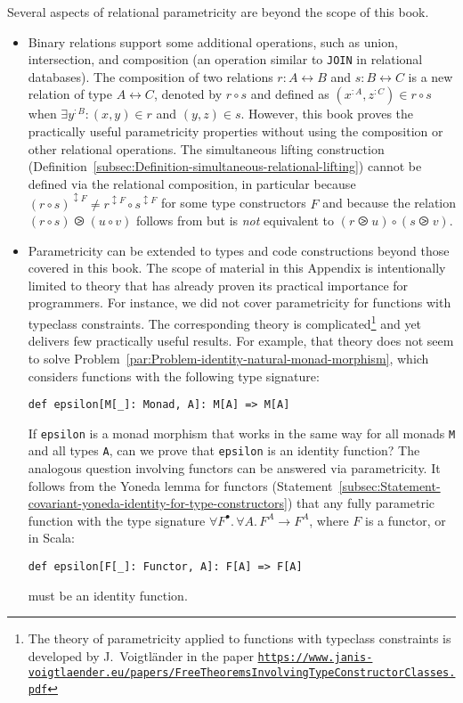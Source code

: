 Several aspects of relational parametricity are beyond the scope of
this book.
\begin{itemize}
\item Binary relations support some additional operations, such as union,
intersection, and composition (an operation similar to \lstinline!JOIN!
in relational databases). The composition of two relations $r:A\leftrightarrow B$
and $s:B\leftrightarrow C$ is a new relation of type $A\leftrightarrow C$,
denoted by $r\circ s$ and defined as $(x^{:A},z^{:C})\in r\circ s$
when $\exists y^{:B}:(x,y)\in r$ and $(y,z)\in s$. However, this
book proves the practically useful parametricity properties without
using the composition or other relational operations. The simultaneous
lifting construction (Definition~\ref{subsec:Definition-simultaneous-relational-lifting})
cannot be defined via the relational composition, in particular because
$(r\circ s)^{\updownarrow F}\neq r^{\updownarrow F}\circ s^{\updownarrow F}$
for some type constructors $F$ and because the relation $(r\circ s)\ogreaterthan(u\circ v)$
follows from but is \emph{not} equivalent to $(r\ogreaterthan u)\circ(s\ogreaterthan v)$. 
\item Parametricity can be extended to types and code constructions beyond
those covered in this book. The scope of material in this Appendix
is intentionally limited to theory that has already proven its practical
importance for programmers. For instance, we did not cover parametricity
for functions with typeclass constraints. The corresponding theory
is complicated\footnote{The theory of parametricity applied to functions with typeclass constraints
is developed by J.~Voigtl\"ander
in the paper \texttt{\href{https://www.janis-voigtlaender.eu/papers/FreeTheoremsInvolvingTypeConstructorClasses.pdf}{https://www.janis-voigtlaender.eu/papers/FreeTheoremsInvolvingTypeConstructorClasses.pdf}}} and yet delivers few practically useful results. For example, that
theory does not seem to solve Problem~\ref{par:Problem-identity-natural-monad-morphism},
which considers functions with the following type signature:
\begin{lstlisting}
def epsilon[M[_]: Monad, A]: M[A] => M[A]
\end{lstlisting}
If \lstinline!epsilon! is a monad morphism that works in the same
way for all monads \lstinline!M! and all types \lstinline!A!, can
we prove that \lstinline!epsilon! is an identity function? The analogous
question involving functors can be answered via parametricity. It
follows from the Yoneda lemma for functors (Statement~\ref{subsec:Statement-covariant-yoneda-identity-for-type-constructors})
that any fully parametric function with the type signature $\forall F^{\bullet}.\,\forall A.\,F^{A}\rightarrow F^{A}$,
where $F$ is a functor, or in Scala:
\begin{lstlisting}
def epsilon[F[_]: Functor, A]: F[A] => F[A]
\end{lstlisting}
must be an identity function.
\end{itemize}

